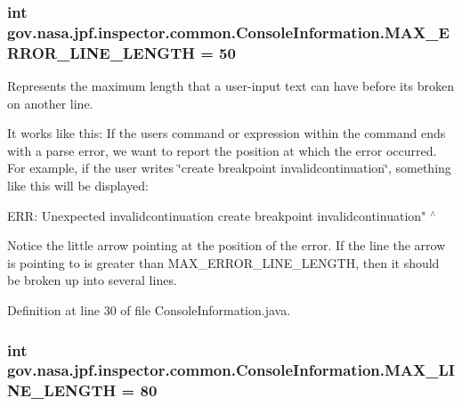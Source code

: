 \subsubsection[{\texorpdfstring{M\+A\+X\+\_\+\+E\+R\+R\+O\+R\+\_\+\+L\+I\+N\+E\+\_\+\+L\+E\+N\+G\+TH}{MAX_ERROR_LINE_LENGTH}}]{\setlength{\rightskip}{0pt plus 5cm}int gov.\+nasa.\+jpf.\+inspector.\+common.\+Console\+Information.\+M\+A\+X\+\_\+\+E\+R\+R\+O\+R\+\_\+\+L\+I\+N\+E\+\_\+\+L\+E\+N\+G\+TH = 50\hspace{0.3cm}{\ttfamily [static]}}\hypertarget{classgov_1_1nasa_1_1jpf_1_1inspector_1_1common_1_1_console_information_ac16e68639ca5e13db2dab0aacbbf3ca8}{}\label{classgov_1_1nasa_1_1jpf_1_1inspector_1_1common_1_1_console_information_ac16e68639ca5e13db2dab0aacbbf3ca8}


Represents the maximum length that a user-\/input text can have before it\textquotesingle{}s broken on another line. 

It works like this\+: If the user\textquotesingle{}s command or expression within the command ends with a parse error, we want to report the position at which the error occurred. For example, if the user writes \char`\"{}create breakpoint invalidcontinuation\char`\"{}, something like this will be displayed\+:

E\+RR\+: Unexpected \textquotesingle{}invalidcontinuation\textquotesingle{} create breakpoint invalidcontinuation" $^\wedge$

Notice the little arrow pointing at the position of the error. If the line the arrow is pointing to is greater than M\+A\+X\+\_\+\+E\+R\+R\+O\+R\+\_\+\+L\+I\+N\+E\+\_\+\+L\+E\+N\+G\+TH, then it should be broken up into several lines. 

Definition at line 30 of file Console\+Information.\+java.

\subsubsection[{\texorpdfstring{M\+A\+X\+\_\+\+L\+I\+N\+E\+\_\+\+L\+E\+N\+G\+TH}{MAX_LINE_LENGTH}}]{\setlength{\rightskip}{0pt plus 5cm}int gov.\+nasa.\+jpf.\+inspector.\+common.\+Console\+Information.\+M\+A\+X\+\_\+\+L\+I\+N\+E\+\_\+\+L\+E\+N\+G\+TH = 80\hspace{0.3cm}{\ttfamily [static]}}\hypertarget{classgov_1_1nasa_1_1jpf_1_1inspector_1_1common_1_1_console_information_a57d4710532b71af31cf8fedc417384fc}{}\label{classgov_1_1nasa_1_1jpf_1_1inspector_1_1common_1_1_console_information_a57d4710532b71af31cf8fedc417384fc}



